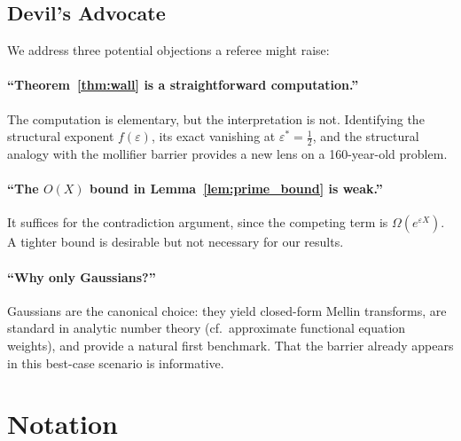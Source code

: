 \documentclass[12pt]{article}
\theoremstyle{remark}
\begin{document}
\subsection{Devil's Advocate}

We address three potential objections a referee might raise:

\paragraph{``Theorem~\ref{thm:wall} is a straightforward computation.''}
The computation is elementary, but the interpretation is not.
Identifying the structural exponent $f(\varepsilon)$, its exact
vanishing at $\varepsilon^* = \tfrac{1}{2}$, and the structural
analogy with the mollifier barrier provides a new lens on a
160-year-old problem.

\paragraph{``The $O(X)$ bound in Lemma~\ref{lem:prime_bound} is weak.''}
It suffices for the contradiction argument, since the competing
term is $\Omega(e^{\varepsilon X})$. A tighter bound is desirable
but not necessary for our results.

\paragraph{``Why only Gaussians?''}
Gaussians are the canonical choice: they yield closed-form Mellin
transforms, are standard in analytic number theory (cf.\ approximate
functional equation weights), and provide a natural first benchmark.
That the barrier already appears in this best-case scenario is
informative.

\appendix

\section{Notation}\label{app:notation}
\end{document}

